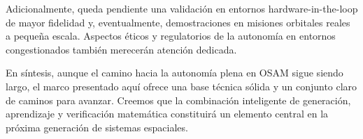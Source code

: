 Adicionalmente, queda pendiente una validación en entornos hardware-in-the-loop de mayor fidelidad y, eventualmente, demostraciones en misiones orbitales reales a pequeña escala. Aspectos éticos y regulatorios de la autonomía en entornos congestionados también merecerán atención dedicada.

En síntesis, aunque el camino hacia la autonomía plena en OSAM sigue siendo largo, el marco presentado aquí ofrece una base técnica sólida y un conjunto claro de caminos para avanzar. Creemos que la combinación inteligente de generación, aprendizaje y verificación matemática constituirá un elemento central en la próxima generación de sistemas espaciales.